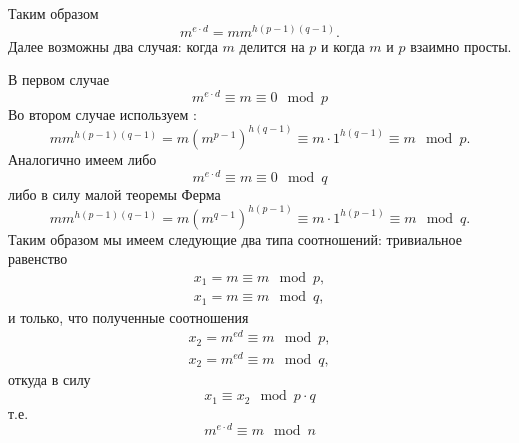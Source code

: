 Таким образом
\[
m^{e\cdot d} =m m^{h \left(p - 1\right)\left(q - 1\right)}.
\]
Далее возможны два случая: когда $m$ делится на $p$ и когда $m$ и $p$
взаимно просты.

В первом случае 
\[
m^{e\cdot d} \equiv m \equiv 0 \mod{p}
\]
Во втором случае используем
:
\[
m m^{h \left(p - 1\right)\left(q - 1\right)} 
= m \left(m^{p - 1}\right)^{h \left(q - 1\right)} \equiv m \cdot 1^{h
  \left(q - 1\right)} \equiv m \mod{p}.
\]
Аналогично имеем либо
\[
m^{e\cdot d} \equiv m \equiv 0 \mod{q}
\]
либо в силу малой теоремы Ферма
\[
m m^{h \left(p - 1\right)\left(q - 1\right)} 
= m \left(m^{q - 1}\right)^{h \left(p - 1\right)} \equiv m \cdot 1^{h
  \left(p - 1\right)} \equiv m \mod{q}.
\]
Таким образом мы имеем следующие два типа соотношений:
тривиальное равенство
\begin{eqnarray}
x_1 = m \equiv m \mod p,
\nonumber \\
x_1 = m \equiv m \mod q,
\nonumber
\end{eqnarray}
и только, что полученные соотношения
\begin{eqnarray}
x_2 = m^{ed} \equiv m \mod p,
\nonumber \\
x_2 = m^{ed} \equiv m \mod q,
\nonumber
\end{eqnarray}
откуда в силу 
\[
x_1 \equiv x_2 \mod p \cdot q
\]
т.е.
\[
m^{e\cdot d} \equiv m \mod n
\]
